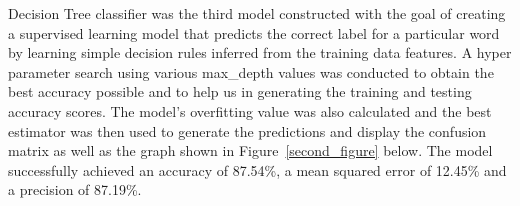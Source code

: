 \documentclass[10pt,twocolumn,letterpaper]{article}
\begin{document}
\begin{figure}[h]
\begin{center}
   \end{center}
        \vspace*{-5mm}
        \caption{\label{third_figure}}
\end{figure}

Decision Tree classifier was the third model constructed with the goal of creating a supervised learning model that predicts the correct label for a particular word by learning simple decision rules inferred from the training data features. A hyper parameter search using various max\_depth values was conducted to obtain the best accuracy possible and to help us in generating the training and testing accuracy scores. The model's overfitting value was also calculated and the best estimator was then used to generate the predictions and display the confusion matrix as well as the graph shown in Figure~\ref{second_figure} below. The model successfully achieved an accuracy of 87.54\%, a mean squared error of 12.45\% and a precision of 87.19\%.
 
\end{document}
